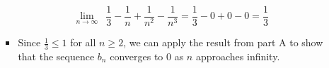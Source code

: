 \documentclass[12pt]{report}
\begin{document}
\begin{enumerate}[leftmargin=\labelsep]
\begin{enumerate}
\begin{tcolorbox}
\begin{itemize}[label={}]
                            \begin{equation*}
                                {\lim_{n \to \infty}}\,\,\, \frac{1}{3} - \frac{1}{n} + \frac{1}{n^2} - \frac{1}{n^3} = \frac{1}{3} - 0 + 0 - 0 = \frac{1}{3}
                            \end{equation*}
                            \item Since $\frac{1}{3} \leq 1$ for all $n \geq 2$, we can apply the result from part A to show that the sequence $b_n$ converges to 0 as $n$ approaches infinity.
                        \end{itemize}
                    \end{tcolorbox}
        \end{enumerate} 


\end{enumerate}
\end{document}
